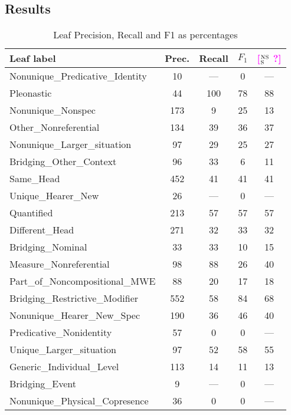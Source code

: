 \documentclass[11pt,letterpaper]{article}
\newcommand{\ensuretext}[1]{#1}
\newcommand{\nssmarker}{\ensuretext{\textcolor{magenta}{\ensuremath{^{\textsc{NS}}_{\textsc{S}}}}}}
\newcommand{\arkcomment}[3]{\ensuretext{\textcolor{#3}{[#1 #2]}}}
\newcommand{\nss}[1]{\arkcomment{\nssmarker}{#1}{magenta}}
\begin{document}
\subsection{Results}

\begin{table*}\small\centering
   \begin{tabular}{lcccc}
      \bf{Leaf label} & \bf{Prec.} & \bf{Recall} & \bf{$F_1$} & \nss{?} \\
      \midrule
Nonunique\_Predicative\_Identity & 10 & --- & 0 & --- \\
Pleonastic & 44 & 100 & 78 & 88 \\
Nonunique\_Nonspec & 173 & 9 & 25 & 13 \\
Other\_Nonreferential & 134 & 39 & 36 & 37 \\
Nonunique\_Larger\_situation & 97 & 29 & 25 & 27 \\
Bridging\_Other\_Context & 96 & 33 & 6 & 11 \\
Same\_Head & 452 & 41 & 41 & 41 \\
Unique\_Hearer\_New & 26 & --- & 0 & --- \\
Quantified & 213 & 57 & 57 & 57 \\
Different\_Head & 271 & 32 & 33 & 32 \\
Bridging\_Nominal & 33 & 33 & 10 & 15 \\
Measure\_Nonreferential & 98 & 88 & 26 & 40 \\
Part\_of\_Noncompositional\_MWE & 88 & 20 & 17 & 18 \\
Bridging\_Restrictive\_Modifier & 552 & 58 & 84 & 68 \\
Nonunique\_Hearer\_New\_Spec & 190 & 36 & 46 & 40 \\
Predicative\_Nonidentity & 57 & 0 & 0 & --- \\
Unique\_Larger\_situation & 97 & 52 & 58 & 55 \\
Generic\_Individual\_Level & 113 & 14 & 11 & 13 \\
Bridging\_Event & 9 & --- & 0 & --- \\
Nonunique\_Physical\_Copresence & 36 & 0 & 0 & --- \\

   \end{tabular}
   \caption{Leaf Precision, Recall and F1 as percentages}
   \label{tbl:leaf}
\end{table*}
\end{document}

